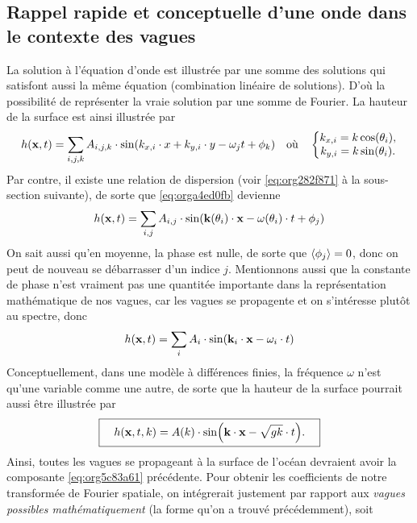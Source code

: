 \documentclass[10pt]{article}
\numberwithin{equation}{section}
\begin{document}
\subsection{Rappel rapide et conceptuelle d'une onde dans le contexte des vagues}
\label{sec:orgbf6c09c}
La solution à l'équation d'onde est illustrée par une somme des solutions qui satisfont aussi la même équation (combination linéaire de solutions).
D'où la possibilité de représenter la vraie solution par une somme de Fourier.
La hauteur de la surface est ainsi illustrée par
\begin{equation}
\label{eq:orga4ed0fb}
   h(\vb{x},t) = \sum_{i,j,k} A_{i,j,k}\cdot\sin(k_{x,i} \cdot x + k_{y,i}\cdot y - \omega_j t + \phi_k)\quad
    \text{où}\quad\left\lbrace\begin{matrix}
      k_{x,i} = k\cos(\theta_{i}), \\
      k_{y,i} = k\sin(\theta_{i}). \\
    \end{matrix}\right.
\end{equation}
Par contre, il existe une relation de dispersion (voir \ref{eq:org282f871} à la sous-section suivante), de sorte que \ref{eq:orga4ed0fb} devienne
\begin{equation}
   h(\vb{x},t) = \sum_{i,j} A_{i,j}\cdot\sin(\vb{k}(\theta_i)\cdot \vb{x} - \omega(\theta_i)\cdot t + \phi_j)
\end{equation}
On sait aussi qu'en moyenne, la phase est nulle, de sorte que \(\expval{\phi_j} = 0\), donc on peut de nouveau se débarrasser d'un indice \(j\).
Mentionnons aussi que la constante de phase n'est vraiment pas une quantitée importante dans la représentation mathématique de nos vagues, car les vagues se propagente et on s'intéresse plutôt au spectre, donc
\begin{equation}
   h(\vb{x},t) = \sum_{i} A_{i} \cdot\sin(\vb{k}_i \cdot \vb{x} - \omega_i \cdot t)
\end{equation}
Conceptuellement, dans une modèle à différences finies, la fréquence \(\omega\) n'est qu'une variable comme une autre, de sorte que la hauteur de la surface pourrait aussi être illustrée par
\begin{equation}
\label{eq:org5c83a61}
   \boxed{\quad h(\vb{x},t,k) = A(k) \cdot\sin(\vb{k} \cdot \vb{x} - \sqrt{gk}\cdot t).\quad}
\end{equation}
Ainsi, toutes les vagues se propageant à la surface de l'océan devraient avoir la composante \ref{eq:org5c83a61} précédente.
Pour obtenir les coefficients de notre transformée de Fourier spatiale, on intégrerait justement par rapport aux \emph{vagues possibles mathématiquement} (la forme qu'on a trouvé précédemment), soit
\end{document}
